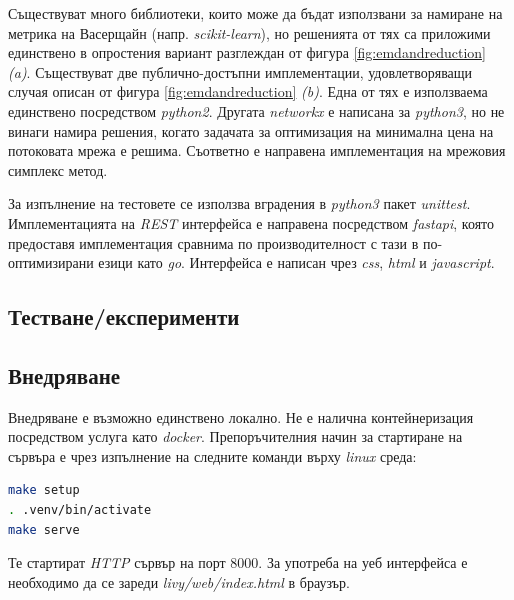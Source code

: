 \documentclass[a4paper,12pt]{article}
\begin{document}
\bigbreak

Съществуват много библиотеки, които може да бъдат използвани за намиране на метрика на Васерщайн (напр. \textit{scikit-learn}), но решенията от тях са приложими единствено в опростения вариант разглеждан от фигура \ref{fig:emdandreduction} \textit{(a)}. Съществуват две публично-достъпни имплементации, удовлетворяващи случая описан от фигура \ref{fig:emdandreduction} \textit{(b)}. Една от тях е използваема единствено посредством \textit{python2}. Другата \textit{networkx} е написана за \textit{python3}, но не винаги намира решения, когато задачата за оптимизация на минимална цена на потоковата мрежа е решима. Съответно е направена имплементация на мрежовия симплекс метод.

\bigbreak

За изпълнение на тестовете се използва вградения в \textit{python3} пакет \textit{unittest}. Имплементацията на \textit{REST} интерфейса е направена посредством \textit{fastapi}, която предоставя имплементация сравнима по производителност с тази в по-оптимизирани езици като \textit{go}. Интерфейса е написан чрез \textit{css}, \textit{html} и \textit{javascript}.

\subsection{Тестване/експерименти}



\subsection{Внедряване}

Внедряване е възможно единствено локално. Не е налична контейнеризация посредством услуга като \textit{docker}. Препоръчителния начин за стартиране на сървъра е чрез изпълнение на следните команди върху \textit{linux} среда:

\begin{lstlisting}[language=bash, caption={Внедряване на сървъра}]
make setup
. .venv/bin/activate
make serve
\end{lstlisting}

\bigbreak

Те стартират \textit{HTTP} сървър на порт $8000$. За употреба на уеб интерфейса е необходимо да се зареди \textit{livy/web/index.html} в браузър.
\end{document}
